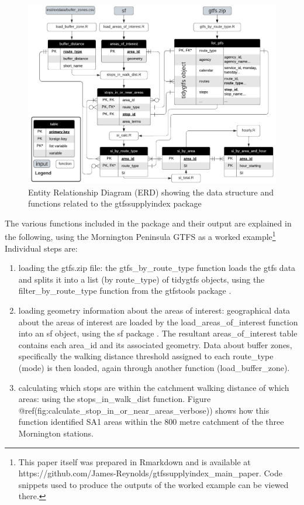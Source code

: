 \documentclass[preprint, 3p,
authoryear]{elsarticle} %
\begin{document}
\begin{figure}
\includegraphics[width=1\linewidth]{graphics/SI_data_structure} \caption{Entity Relationship Diagram (ERD) showing the data structure and functions related to the gtfssupplyindex package}\label{fig:SI_ERD}
\end{figure}

The various functions included in the package and their output are
explained in the following, using the Mornington Peninsula GTFS as a
worked example\footnote{This paper itself was prepared in Rmarkdown and
  is available at
  https://github.com/James-Reynolds/gtfssupplyindex\_main\_paper. Code
  snippets used to produce the outputs of the worked example can be
  viewed there.} Individual steps are:

\begin{enumerate}
\def\labelenumi{(\arabic{enumi})}
\item
  loading the gtfs.zip file: the gtfs\_by\_route\_type function loads
  the gtfs data and splits it into a list (by route\_type) of tidygtfs
  objects, using the filter\_by\_route\_type function from the gtfstools
  package \citep{filter_GTFS_by_mode}.
\item
  loading geometry information about the areas of interest: geographical
  data about the areas of interest are loaded by the
  load\_areas\_of\_interest function into an sf object, using the sf
  package \citep{R-sf}. The resultant areas\_of\_interest table contains
  each area\_id and its associated geometry. Data about buffer zones,
  specifically the walking distance threshold assigned to each
  route\_type (mode) is then loaded, again through another function
  (load\_buffer\_zone).
\item
  calculating which stops are within the catchment walking distance of
  which areas: using the stops\_in\_walk\_dist function. Figure
  @ref(fig:calculate\_stop\_in\_or\_near\_areas\_verbose)) shows how
  this function identified SA1 areas within the 800 metre catchment of
  the three Mornington stations.
\end{enumerate}
\end{document}
